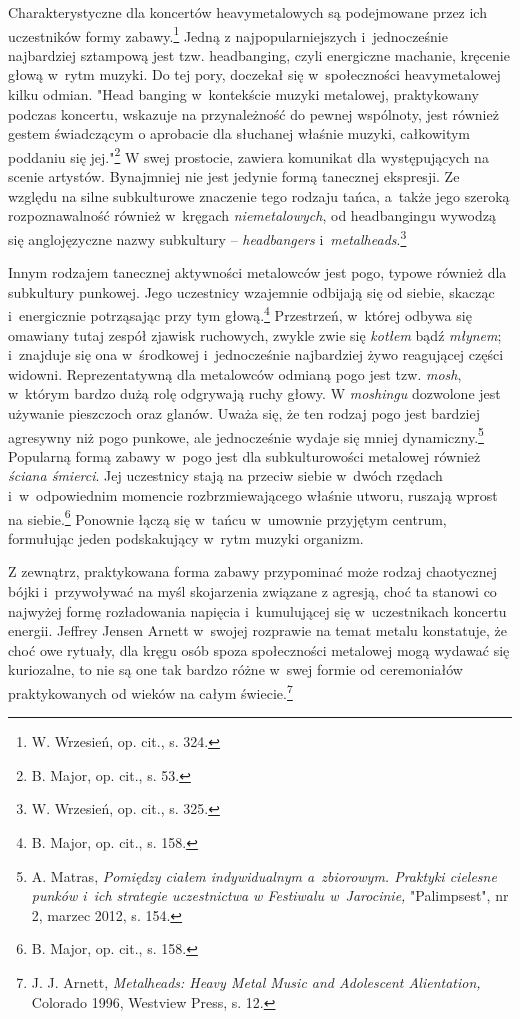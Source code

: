\documentclass[12pt, a4paper, titlepage]{report}
\begin{document}
Charakterystyczne dla koncertów heavymetalowych są podejmowane przez ich uczestników formy zabawy.\footnote{W. Wrzesień, op. cit., s. 324.} Jedną z najpopularniejszych i~jednocześnie najbardziej sztampową jest tzw. headbanging, czyli energiczne machanie, kręcenie głową w~rytm muzyki. Do tej pory, doczekał się w~społeczności heavymetalowej kilku odmian. "Head banging w~kontekście muzyki metalowej, praktykowany podczas koncertu, wskazuje na przynależność do pewnej wspólnoty, jest również gestem świadczącym o aprobacie dla słuchanej właśnie muzyki, całkowitym poddaniu się jej."\footnote{B. Major, op. cit., s. 53.} W swej prostocie, zawiera komunikat dla występujących na scenie artystów. Bynajmniej nie jest jedynie formą tanecznej ekspresji. Ze względu na silne subkulturowe znaczenie tego rodzaju tańca, a~także jego szeroką rozpoznawalność również w~kręgach \textit{niemetalowych}, od headbangingu wywodzą się anglojęzyczne nazwy subkultury -- \textit{headbangers} i~\textit{metalheads}.\footnote{W. Wrzesień, op. cit., s. 325.} 

Innym rodzajem tanecznej aktywności metalowców jest pogo, typowe również dla subkultury punkowej. Jego uczestnicy wzajemnie odbijają się od siebie, skacząc i~energicznie potrząsając przy tym głową.\footnote{B. Major, op. cit., s. 158.} Przestrzeń, w~której odbywa się omawiany tutaj zespół zjawisk ruchowych, zwykle zwie się \textit{kotłem} bądź \textit{młynem}; i~znajduje się ona w~środkowej i~jednocześnie najbardziej żywo reagującej części widowni. Reprezentatywną dla metalowców odmianą pogo jest tzw. \textit{mosh}, w~którym bardzo dużą rolę odgrywają ruchy głowy. W \textit{moshingu} dozwolone jest używanie pieszczoch oraz glanów. Uważa się, że ten rodzaj pogo jest bardziej agresywny niż pogo punkowe, ale jednocześnie wydaje się mniej dynamiczny.\footnote{A. Matras, \textit{Pomiędzy ciałem indywidualnym a~zbiorowym. Praktyki cielesne punków i~ich strategie uczestnictwa w Festiwalu w~Jarocinie,} "Palimpsest", nr 2, marzec 2012, s. 154.} Popularną formą zabawy w~pogo jest dla subkulturowości metalowej również \textit{ściana śmierci}. Jej uczestnicy stają na przeciw siebie w~dwóch rzędach i~w~odpowiednim momencie rozbrzmiewającego właśnie utworu, ruszają wprost na siebie.\footnote{B. Major, op. cit., s. 158.} Ponownie łączą się w~tańcu w~umownie przyjętym centrum, formułując jeden podskakujący w~rytm muzyki organizm. 

Z zewnątrz, praktykowana forma zabawy przypominać może rodzaj chaotycznej bójki i~przywoływać na myśl skojarzenia związane z agresją, choć ta stanowi co najwyżej formę rozładowania napięcia i~kumulującej się w~uczestnikach koncertu energii. Jeffrey Jensen Arnett w~swojej rozprawie na temat metalu konstatuje, że choć owe rytuały, dla kręgu osób spoza społeczności metalowej mogą wydawać się kuriozalne, to nie są one tak bardzo różne w~swej formie od ceremoniałów praktykowanych od wieków na całym świecie.\footnote{J. J. Arnett,\textit{ Metalheads: Heavy Metal Music and Adolescent Alientation,} Colorado 1996, Westview Press, s. 12.} 
\end{document}
